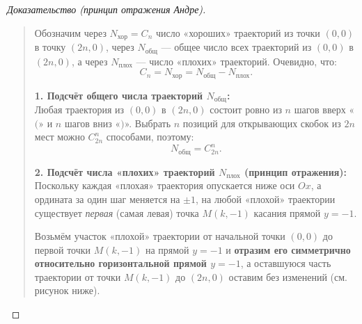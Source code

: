 \begin{proof}[Доказательство (принцип отражения Андре)]~\\
    \begin{quote}
        Обозначим через $N_{\text{хор}} = C_n$ число «хороших» траекторий 
        из точки $(0, 0)$ в точку $(2n, 0)$, через $N_{\text{общ}}$ --- 
        общее число всех траекторий из $(0, 0)$ в $(2n, 0)$, а через 
        $N_{\text{плох}}$ --- число «плохих» траекторий. Очевидно, что:
        \[
            C_n = N_{\text{хор}} = N_{\text{общ}} - N_{\text{плох}}.
        \]

        \textbf{1. Подсчёт общего числа траекторий $N_{\text{общ}}$:}\\
        Любая траектория из $(0, 0)$ в $(2n, 0)$ состоит ровно из $n$ шагов 
        вверх «$($» и $n$ шагов вниз «$)$». Выбрать $n$ позиций для 
        открывающих скобок из $2n$ мест можно $C_{2n}^n$ способами, поэтому:
        \[
            N_{\text{общ}} = C_{2n}^n.
        \]

        \textbf{2. Подсчёт числа «плохих» траекторий $N_{\text{плох}}$ 
        (принцип отражения):}\\
        Поскольку каждая «плохая» траектория опускается ниже оси $Ox$, а 
        ордината за один шаг меняется на $\pm 1$, на любой «плохой» 
        траектории существует \emph{первая} (самая левая) точка $M(k, -1)$ 
        касания прямой $y = -1$.

        Возьмём участок «плохой» траектории от начальной точки $(0, 0)$ до 
        первой точки $M(k, -1)$ на прямой $y = -1$ и \textbf{отразим его 
        симметрично относительно горизонтальной прямой $y = -1$}, а 
        оставшуюся часть траектории от точки $M(k, -1)$ до $(2n, 0)$ 
        оставим без изменений (см. рисунок ниже).

        \begin{figure}[H]
            \centering
\end{figure}
\end{quote}
\end{proof}
